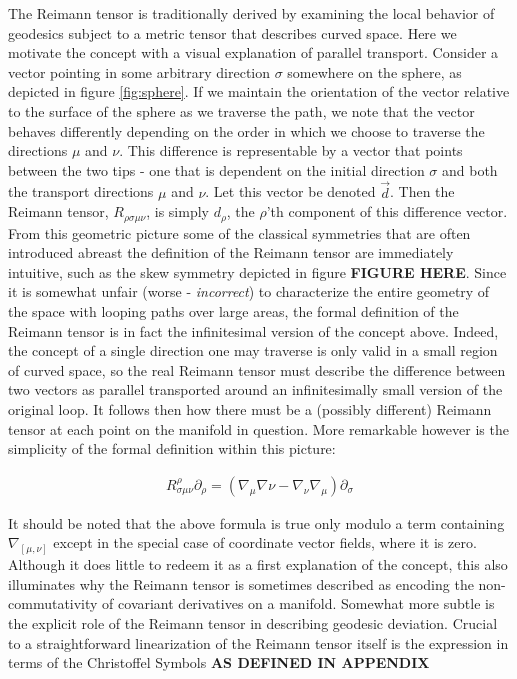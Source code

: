 \documentclass[paper=a4, fontsize=11pt]{scrartcl} %
\numberwithin{equation}{section} %
\numberwithin{figure}{section} %
\numberwithin{table}{section} %
\begin{document}
The Reimann tensor is traditionally derived by examining the local behavior of geodesics subject to a metric tensor that describes curved space. Here we motivate the concept with a visual explanation of parallel transport. Consider a vector pointing in some arbitrary direction $\sigma$ somewhere on the sphere, as depicted in figure \ref{fig:sphere}. If we maintain the orientation of the vector relative to the surface of the sphere as we traverse the path, we note that the vector behaves differently depending on the order in which we choose to traverse the directions $\mu$ and $\nu$. This difference is representable by a vector that points between the two tips - one that is dependent on the initial direction $\sigma$ and both the transport directions $\mu$ and $\nu$. Let this vector be denoted $\vec{d}$. Then the Reimann tensor, $R_{\rho \sigma \mu \nu}$, is simply $d_{\rho}$, the $\rho$'th component of this difference vector. From this geometric picture some of the classical symmetries that are often introduced abreast the definition of the Reimann tensor are immediately intuitive, such as the skew symmetry depicted in figure \textbf{FIGURE HERE}.
Since it is somewhat unfair (worse - \textit{incorrect}) to characterize the entire geometry of the space with looping paths over large areas, the formal definition of the Reimann tensor is in fact the infinitesimal version of the concept above. Indeed, the concept of a single direction one may traverse is only valid in a small region of curved space, so the real Reimann tensor must describe the difference between two vectors as parallel transported around an infinitesimally small version of the original loop. It follows then how there must be a (possibly different) Reimann tensor at each point on the manifold in question. More remarkable however is the simplicity of the formal definition within this picture:

\begin{align}
R^{\rho}_{\sigma \mu \nu}\partial_{\rho} = \left(\nabla_{\mu}\nabla{\nu} - \nabla_{\nu}\nabla_{\mu}\right)\partial_{\sigma}
\end{align} 

It should be noted that the above formula is true only modulo a term containing $\nabla_{[\mu, \nu]}$ except in the special case of coordinate vector fields, where it is zero. Although it does little to redeem it as a first explanation of the concept, this also illuminates why the Reimann tensor is sometimes described as encoding the non-commutativity of covariant derivatives on a manifold. Somewhat more subtle is the explicit role of the Reimann tensor in describing geodesic deviation. Crucial to a straightforward linearization of the Reimann tensor itself is the expression in terms of the Christoffel Symbols \textbf{AS DEFINED IN APPENDIX}
\end{document}
